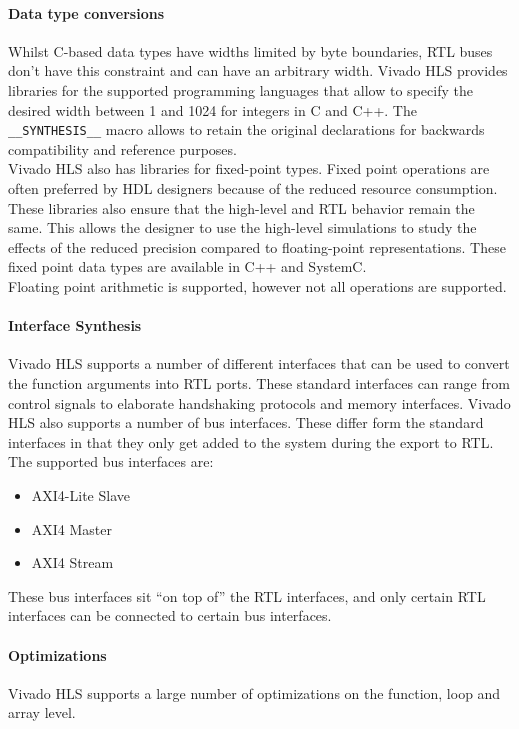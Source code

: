 \paragraph{Data type conversions}
Whilst C-based data types have widths limited by byte boundaries, RTL buses don't have this constraint and can have an arbitrary width. Vivado HLS provides libraries for the supported programming languages that allow to specify the desired width between 1 and 1024 for integers in C and C++. The \texttt{\_\_SYNTHESIS\_\_} macro allows to retain the original declarations for backwards compatibility and reference purposes.\\ Vivado HLS also has libraries for fixed-point types. Fixed point operations are often preferred by HDL designers because of the reduced resource consumption. These libraries also ensure that the high-level and RTL behavior remain the same. This allows the designer to use the high-level simulations to study the effects of the reduced precision compared to floating-point representations. These fixed point data types are available in C++ and SystemC.\\
Floating point arithmetic is supported, however not all operations are supported. 

\paragraph{Interface Synthesis}
Vivado HLS supports a number of different interfaces that can be used to convert the function arguments into RTL ports. These standard interfaces can range from control signals to elaborate handshaking protocols and memory interfaces. Vivado HLS also supports a number of bus interfaces. These differ form the standard interfaces in that they only get added to the system during the export to RTL. The supported bus interfaces are:
\begin{itemize}
	\item AXI4-Lite Slave
	\item AXI4 Master
	\item AXI4 Stream
\end{itemize}

These bus interfaces sit ``on top of'' the RTL interfaces, and only certain RTL interfaces can be connected to certain bus interfaces.

\paragraph{Optimizations}
Vivado HLS supports a large number of optimizations on the function, loop and array level.

